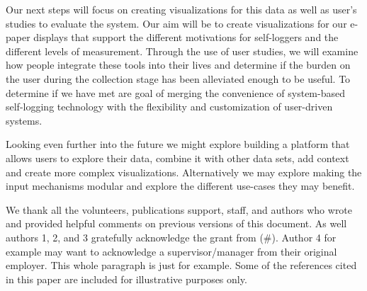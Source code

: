 \documentclass[sigchi-a, authorversion]{acmart}
\begin{document}
Our next steps will focus on creating visualizations for this data as well as user’s studies to evaluate the system. Our aim will be to create visualizations for our e-paper displays that support the different motivations for self-loggers and the different levels of measurement. Through the use of user studies, we will examine how people integrate these tools into their lives and determine if the burden on the user during the collection stage has been alleviated enough to be useful. To determine if we have met are goal of merging the convenience of system-based self-logging technology with the flexibility and customization of user-driven systems.

Looking even further into the future we might explore building a platform that allows users to explore their data, combine it with other data sets, add context and create more complex visualizations. Alternatively we may explore making the input mechanisms modular and explore the different use-cases they may benefit. 


\begin{acks}
  We thank all the volunteers, publications support, staff, and
  authors who wrote and provided helpful comments on previous versions
  of this document. As well authors 1, 2, and 3 gratefully acknowledge
  the grant from 
  (\#). Author 4 for example may want to
  acknowledge a supervisor/manager from their original employer. This
  whole paragraph is just for example. Some of the references cited in
  this paper are included for illustrative purposes only.
\end{acks}




\end{document}
